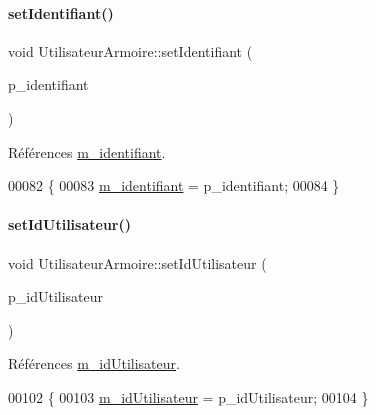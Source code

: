 \paragraph{\texorpdfstring{set\+Identifiant()}{setIdentifiant()}}
{\footnotesize\ttfamily void Utilisateur\+Armoire\+::set\+Identifiant (\begin{DoxyParamCaption}\item[{Q\+String}]{p\+\_\+identifiant }\end{DoxyParamCaption})}



Références \hyperlink{class_utilisateur_armoire_a30cb02e16dd9085a70c6b436781bb756}{m\+\_\+identifiant}.


\begin{DoxyCode}
00082 \{
00083     \hyperlink{class_utilisateur_armoire_a30cb02e16dd9085a70c6b436781bb756}{m\_identifiant} = p\_identifiant;
00084 \}
\end{DoxyCode}
\mbox{\label{class_utilisateur_armoire_a51fa6e41f395f6bbe1c3b763eaa93dee}} 
\paragraph{\texorpdfstring{set\+Id\+Utilisateur()}{setIdUtilisateur()}}
{\footnotesize\ttfamily void Utilisateur\+Armoire\+::set\+Id\+Utilisateur (\begin{DoxyParamCaption}\item[{Q\+String}]{p\+\_\+id\+Utilisateur }\end{DoxyParamCaption})}



Références \hyperlink{class_utilisateur_armoire_a7e3072a1a336d5ee1cf87c81d27b11e0}{m\+\_\+id\+Utilisateur}.


\begin{DoxyCode}
00102 \{
00103     \hyperlink{class_utilisateur_armoire_a7e3072a1a336d5ee1cf87c81d27b11e0}{m\_idUtilisateur} = p\_idUtilisateur;
00104 \}
\end{DoxyCode}
\mbox{\label{class_utilisateur_armoire_a8a1031cc1ca9a197e49c0adeb1f54923}} 
